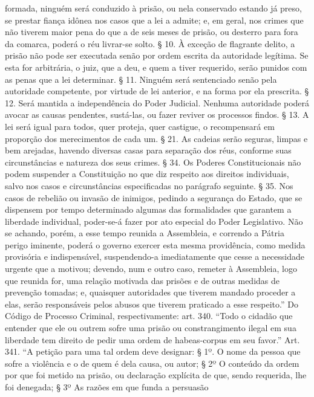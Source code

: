 {  formada, ninguém será conduzido à prisão, ou nela conservado estando
  já preso, se prestar fiança idônea nos casos que a lei a admite; e, em
  geral, nos crimes que não tiverem maior pena do que a de seis meses de
  prisão, ou desterro para fora da comarca, poderá o réu livrar-se
  solto. § 10. À exceção de flagrante delito, a prisão não pode ser
  executada senão por ordem escrita da autoridade legítima. Se esta for
  arbitrária, o juiz, que a deu, e quem a tiver requerido, serão punidos
  com as penas que a lei determinar. § 11. Ninguém será sentenciado
  senão pela autoridade competente, por virtude de lei anterior, e na
  forma por ela prescrita. § 12. Será mantida a independência do Poder
  Judicial. Nenhuma autoridade poderá avocar as causas pendentes,
  sustá-las, ou fazer reviver os processos findos. § 13. A lei será
  igual para todos, quer proteja, quer castigue, o recompensará em
  proporção dos merecimentos de cada um. § 21. As cadeias serão seguras,
  limpas e bem arejadas, havendo diversas casas para separação dos réus,
  conforme suas circunstâncias e natureza dos seus crimes. § 34. Os
  Poderes Constitucionais não podem suspender a Constituição no que diz
  respeito aos direitos individuais, salvo nos casos e circunstâncias
  especificadas no parágrafo seguinte. § 35. Nos casos de rebelião ou
  invasão de inimigos, pedindo a segurança do Estado, que se dispensem
  por tempo determinado algumas das formalidades que garantem a
  liberdade individual, poder-se-á fazer por ato especial do Poder
  Legislativo. Não se achando, porém, a esse tempo reunida a Assembleia,
  e correndo a Pátria perigo iminente, poderá o governo exercer esta
  mesma providência, como medida provisória e indispensável,
  suspendendo-a imediatamente que cesse a necessidade urgente que a
  motivou; devendo, num e outro caso, remeter à Assembleia, logo que
  reunida for, uma relação motivada das prisões e de outras medidas de
  prevenção tomadas; e, quaisquer autoridades que tiverem mandado
  proceder a elas, serão responsáveis pelos abusos que tiverem praticado
  a esse respeito.'' Do Código de Processo Criminal, respectivamente:
  art. 340. ``Todo o cidadão que entender que ele ou outrem sofre uma
  prisão ou constrangimento ilegal em sua liberdade tem direito de
  pedir uma ordem de habeas-corpus em seu favor.'' Art. 341. ``A petição
  para uma tal ordem deve designar: § 1º. O nome da pessoa que sofre a
  violência e o de quem é dela causa, ou autor; § 2º O conteúdo da ordem
  por que foi metido na prisão, ou declaração explícita de que, sendo
  requerida, lhe foi denegada; § 3º As razões em que funda a persuasão
}
